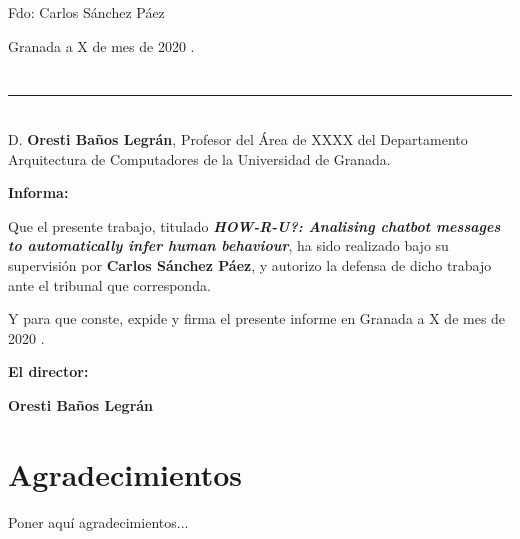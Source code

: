 \vspace{6cm}

\begin{center}
  Fdo: Carlos Sánchez Páez

\end{center}

\vspace{2cm}

\begin{flushright}
Granada a X de mes de 2020 .
\end{flushright}

\newpage

\section*{}
\thispagestyle{empty}

\noindent\rule[-1ex]{\textwidth}{2pt}\\[4.5ex]

D. \textbf{Oresti Baños Legrán}, Profesor del Área de XXXX del Departamento Arquitectura de Computadores de la Universidad de Granada.



\vspace{0.5cm}

\textbf{Informa:}

\vspace{0.5cm}

Que el presente trabajo, titulado \textit{\textbf{HOW-R-U?: Analising chatbot messages to automatically infer human behaviour}},
ha sido realizado bajo su supervisión por \textbf{Carlos Sánchez Páez}, y autorizo la defensa de dicho trabajo ante el tribunal
que corresponda.

\vspace{0.5cm}

Y para que conste, expide y firma el presente informe en Granada a X de mes de 2020 .

\vspace{1cm}

\textbf{El director:}

\vspace{5cm}
\begin{center}
\textbf{Oresti Baños Legrán}

\end{center}


\newpage

\section*{Agradecimientos}
\thispagestyle{empty}

       \vspace{1cm}


Poner aquí agradecimientos...
